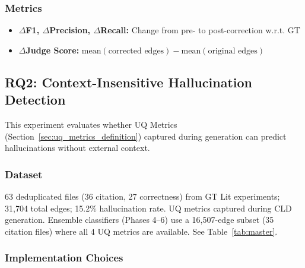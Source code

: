 \subsubsection{Metrics}
\begin{itemize}[noitemsep]
    \item \textbf{$\Delta$F1, $\Delta$Precision, $\Delta$Recall:} Change from pre- to post-correction w.r.t. GT
    \item \textbf{$\Delta$Judge Score:} $\text{mean}(\text{corrected edges}) - \text{mean}(\text{original edges})$
\end{itemize}

\subsection{RQ2: Context-Insensitive Hallucination Detection}
\label{sec:rq2_experiments}

This experiment evaluates whether UQ Metrics (Section~\ref{sec:uq_metrics_definition}) captured during generation can predict hallucinations without external context.

\subsubsection{Dataset}
63 deduplicated files (36 citation, 27 correctness) from GT Lit experiments; 31,704 total edges; 15.2\% hallucination rate. UQ metrics captured during CLD generation. Ensemble classifiers (Phases 4--6) use a 16,507-edge subset (35 citation files) where all 4 UQ metrics are available. See Table~\ref{tab:master}.

\subsubsection{Implementation Choices}

